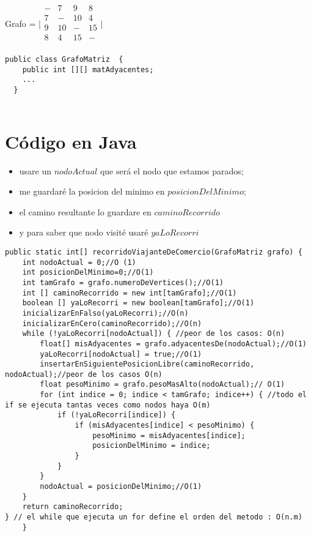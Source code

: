 \documentclass[a4paper,11pt]{article}
\begin{document}
Grafo = $\bigl|\begin{smallmatrix}-&7&9&8\\ 7&-&10&4 \\9&10&-&15 \\8&4&15&- \\\end{smallmatrix}\bigr|$
\begin{lstlisting}
public class GrafoMatriz  {
    public int [][] matAdyacentes;
    ...
  }
      
\end{lstlisting}
\section*{Código en Java}
\begin{itemize}
  \item usare un $nodoActual$ que será el nodo que estamos parados;
  \item  me guardaré la posicion del minimo en $posicionDelMinimo$;
  \item el camino resultante lo guardare en $ caminoRecorrido$
  \item  y para saber que nodo visité usaré $yaLoRecorri$
\end{itemize}

 \lstset{language=Java, breaklines=true, basicstyle=\footnotesize}
\begin{lstlisting}[frame=single]
public static int[] recorridoViajanteDeComercio(GrafoMatriz grafo) {
	int nodoActual = 0;//O (1)
	int posicionDelMinimo=0;//O(1)
	int tamGrafo = grafo.numeroDeVertices();//O(1)
	int [] caminoRecorrido = new int[tamGrafo];//O(1)
	boolean [] yaLoRecorri = new boolean[tamGrafo];//O(1)
	inicializarEnFalso(yaLoRecorri);//O(n)
	inicializarEnCero(caminoRecorrido);//O(n)
	while (!yaLoRecorri[nodoActual]) { //peor de los casos: O(n)
		float[] misAdyacentes = grafo.adyacentesDe(nodoActual);//O(1)
		yaLoRecorri[nodoActual] = true;//O(1)
		insertarEnSiguientePosicionLibre(caminoRecorrido, nodoActual);//peor de los casos O(n)
		float pesoMinimo = grafo.pesoMasAlto(nodoActual);// O(1)
		for (int indice = 0; indice < tamGrafo; indice++) { //todo el if se ejecuta tantas veces como nodos haya O(m)
			if (!yaLoRecorri[indice]) {
				if (misAdyacentes[indice] < pesoMinimo) {
					pesoMinimo = misAdyacentes[indice];
					posicionDelMinimo = indice;
				}
			}
		}
		nodoActual = posicionDelMinimo;//O(1)
	}
	return caminoRecorrido;
} // el while que ejecuta un for define el orden del metodo : O(n.m)
    }
\end{lstlisting}
\end{document}
